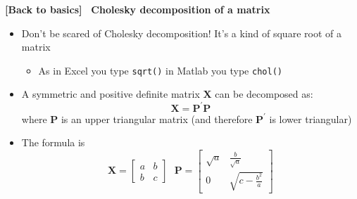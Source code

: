 \documentclass[10pt,handout]{beamer}
\begin{document}
\begin{frame}
{{\footnotesize \textbf{[Back to basics]}} \textbf{\ {Cholesky decomposition
of a matrix } }}

\begin{itemize}
\item Don't be scared of Cholesky decomposition! It's a kind of square root
of a matrix

\begin{itemize}
\item As in Excel you type \texttt{sqrt()} in Matlab you type \texttt{chol()}%
\medskip \pause
\end{itemize}

\item A symmetric and positive definite matrix $\mathbf{X}$ can be
decomposed as:%
\begin{equation*}
\mathbf{X}=\mathbf{P}^{\prime }\mathbf{P}
\end{equation*}%
where $\mathbf{P}$ is an upper triangular matrix (and therefore $\mathbf{P}%
^{\prime }$ is lower triangular)\medskip \pause

\item The formula is 
\begin{equation*}
\mathbf{X}=%
\begin{bmatrix}
a & b \\ 
b & c%
\end{bmatrix}%
\ \ \ \mathbf{P}=%
\begin{bmatrix}
\sqrt{a} & \frac{b}{\sqrt{a}} \\ 
0 & \sqrt{c-\frac{b^{2}}{a}}%
\end{bmatrix}%
\end{equation*}
\end{itemize}
\end{frame}

\everymath\expandafter{\the\everymath \color{title!80}}
\everydisplay\expandafter{\the\everydisplay \color{title!80}}%
\end{document}
